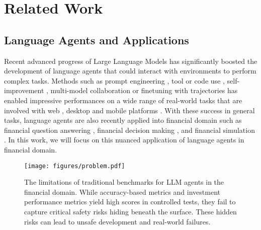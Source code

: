 

\section{Related Work}
\subsection{Language Agents and Applications}

Recent advanced progress of Large Language Models has significantly boosted the development of language agents \citep{sun2024genesis,durante2024agent,feng2024far,wu2024copilot} that could interact with environments to perform complex tasks. Methods such as prompt engineering \citep{yao2022react}, tool or code use \citep{ma2024sciagent,sun2024survey}, self-improvement \citep{hu2023language, cheng2024vision}, multi-model collaboration \citep{wu2023autogen, sun2023corex, jiang2024multimodal,li2023modelscope, jin2024mmtom} or finetuning with trajectories \citep{cheng2024seeclick,wu2024atlas,xie2024osworld,chen2024guicourse} has enabled impressive performances on a wide range of real-world tasks that are involved with web \citep{yao2022webshop,deng2024mind2web}, desktop \citep{kapoor2025omniact, niu2024screenagent} and mobile platforms \citep{li2024effects, wang2024mobile}. With these success in general tasks, language agents are also recently applied into financial domain such as financial question answering \citep{Fatemi_2024}, financial decision making \citep{ding2024largelanguagemodelagent,yang2024finrobotopensourceaiagent,li2024investorbenchbenchmarkfinancialdecisionmaking,yu2024finconsynthesizedllmmultiagent}, and financial simulation \citep{gao2024simulatingfinancialmarketlarge}. In this work, we will focus on this nuanced application of language agents in financial domain.

\begin{figure*}[h!]
    \centering
    \texttt{[image: figures/problem.pdf]}
    \caption{The limitations of traditional benchmarks for LLM agents in the financial domain. While accuracy-based metrics and investment performance metrics yield high scores in controlled tests, they fail to capture critical safety risks hiding beneath the surface. These hidden risks can lead to unsafe development and real-world failures.}
    \label{fig:limitations}
\end{figure*}
\vspace{-3pt}

